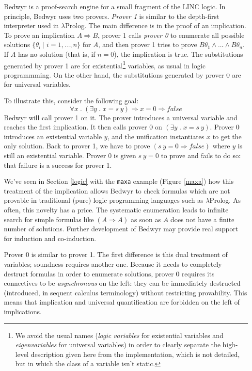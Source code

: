 \documentclass{article}
\newcommand{\lp}{$\lambda$Prolog}
\newcommand{\qs}{\; . \;}
\begin{document}
Bedwyr is a proof-search engine for a small fragment of the LINC
logic.  In principle, Bedwyr uses two provers.  {\em Prover 1} is similar to
the depth-first interpreter used in $\lambda$Prolog.  The main
difference is in the proof of an implication.
To prove an implication $A\Rightarrow B$, prover 1  calls {\em prover 0}
to enumerate all possible solutions
$\{\theta_i\;|\;i=1,\ldots,n\}$ for $A$,
and then prover 1 tries to prove $B\theta_1\wedge\dots\wedge B\theta_n$.
If $A$ has no solution (that is, if $n=0$), the implication is true.
The substitutions generated by prover 1 are for existential\footnote{
We avoid the usual names (\emph{logic variables} for existential variables and
\emph{eigenvariables} for universal variables) in order to clearly separate the
high-level description given here from the implementation, which is not
detailed, but in which the class of a variable isn't static.}
variables, as usual in logic programmming.
On the other hand, the substitutions generated by prover 0 are for
universal variables.

To illustrate this,
consider the following goal:
\[ \forall x \qs (\exists y \qs x=s~y) \Rightarrow x=0 \Rightarrow false \]
Bedwyr will call prover 1 on it. The prover introduces a universal variable
and reaches the first implication.
It then calls prover 0 on $(\exists y \qs x = s~y)$.
Prover 0 introduces an existential variable $y$,
and the unification instantiates $x$ to get the only solution.
Back to prover 1, we have to prove $(s~y = 0 \Rightarrow false)$
where $y$ is still an existential variable. Prover 0 is given $s~y=0$
to prove and fails to do so: that failure is a success for prover 1.

We've seen in Section \ref{logic} with the \verb.maxa. example
(Figure \ref{maxa}) how this treatment of the implication allows
Bedwyr to check formulas which are not provable in traditional (pure) logic
programming languages such as \lp.
As often, this novelty has a price. The systematic enumeration leads to
infinite search for simple formulas like $(A \Rightarrow A)$ as soon as
$A$ does not have a finite number of solutions.
Further development of Bedwyr may provide
real support for induction and co-induction.

Prover 0 is similar to prover 1.
The first difference is this dual treatment of variables;
soundness requires another one.
Because it needs to completely destruct formulas in order to enumerate
solutions, prover 0 requires its connectives to be \emph{asynchronous} on the
left: they can be immediately destructed (introduced, in sequent
calculus terminology) without restricting provability.
This means that implication and universal quantification are forbidden on the
left of implications.
\end{document}
